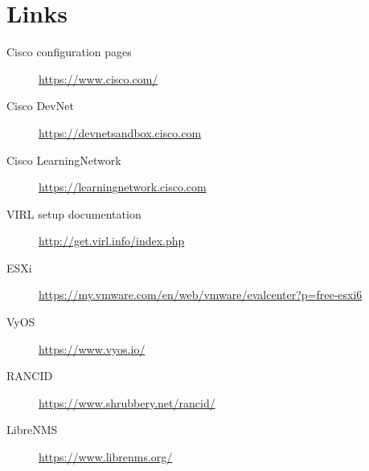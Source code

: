 \documentclass{article}
\begin{document}
\newpage

\section{Links}
\begin{description}
	\item [Cisco configuration pages] \url{https://www.cisco.com/}
	\item[Cisco DevNet] \url{https://devnetsandbox.cisco.com}
	\item[Cisco LearningNetwork] \url{https://learningnetwork.cisco.com}
	\item[VIRL setup documentation] \url{http://get.virl.info/index.php}
	\item[ESXi] \url{https://my.vmware.com/en/web/vmware/evalcenter?p=free-esxi6}
	\item[VyOS] \url{https://www.vyos.io/}
	\item[RANCID] \url{https://www.shrubbery.net/rancid/}
	\item[LibreNMS] \url{https://www.librenms.org/}
\end{description} 
\end{document}
